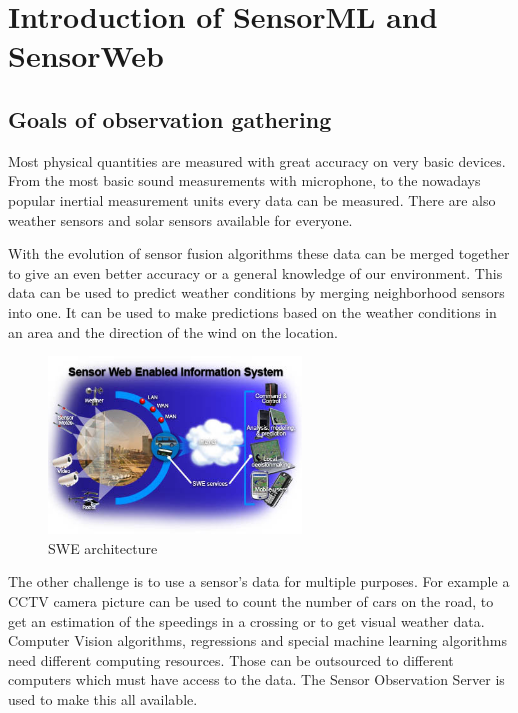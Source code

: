 \chapter{Introduction of SensorML and SensorWeb}\label{sect:Introduction}
\section{Goals of observation gathering}
Most physical quantities are measured with great accuracy on very basic devices. From the most basic sound measurements with microphone, to the nowadays popular inertial measurement units every data can be measured. There are also weather sensors and solar sensors available for everyone.

 With the evolution of sensor fusion algorithms these data can be merged together to give an even better accuracy or a general knowledge of our environment. This data can be used to predict weather conditions by merging neighborhood sensors into one. It can be used to make predictions based on the weather conditions in an area and the direction of the wind on the location.
 
 \begin{figure}[h]
 \centering
  \includegraphics[width=0.6\textwidth]{figures/webswe.png}
 \caption{SWE architecture\label{fig:webswe}}
 \end{figure}
 
 
 The other challenge is to use a sensor's data for multiple purposes. For example a CCTV camera picture can be used to count the number of cars on the road, to get an estimation of the speedings in a crossing or to get visual weather data. Computer Vision algorithms, regressions and special machine learning algorithms need different computing resources. Those can be outsourced to different computers which must have access to the data. The Sensor Observation Server is used to make this all available.
 
